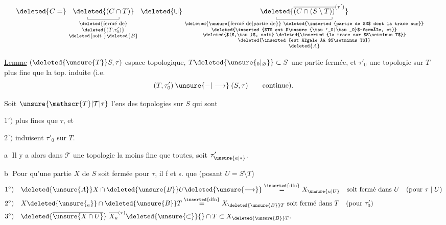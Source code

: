 \[
\begin{aligned}
 &\deleted{C=}\ \underset{\substack{\text{\deleted{fermé de}}\\\deleted{(T,\tau'_0)}\\\text{\deleted{soit }}\deleted{B}}}{\underset{\rule{.35pt}{.35em}\rule{4.4em}{.35pt}\rule{.35pt}{.35em}}{\deleted{(C\cap T)}}}
 \ \deleted{\cup}\ 
 \underset{\substack{\text{\deleted{\unsure{fermé de|partie de}} \deleted{\inserted{partie de $S$ dont la trace sur}}}\\
 \text{\deleted{\inserted{$T$ est $\unsure{\tau'_0|\tau_0}$-fermée, et}}}\\
 \text{\deleted{$(S,\tau)$, soit} \deleted{\inserted{la trace sur $S\setminus T$}}}\\
 \text{\deleted{\inserted{est égale à $S\setminus T$}}}\\\deleted{A}}}{\underset{\rule{.35pt}{.35em}\rule{7.8em}{.35pt}\rule{.35pt}{.35em}}{\deleted{\overline{(C\cap(S\setminus T))}^{(\tau')}}}}
\end{aligned}
\]

\uline{Lemme}\quad {} $(\deleted{\unsure{T}}S,\tau)$ espace topologique, $T\deleted{\unsure{_0|_{\varnothing}}}\subset S$ une partie fermée, et $\tau'_0$ une topologie  sur $T$ plus fine que la top. induite (i.e.
\[
 (T,\tau'_0)\mathbin{\unsure{-|\longrightarrow}}(S,\tau)\qquad\text{continue).}
\]


 Soit \uline{$\unsure{\mathscr{T}|\mathcal T|\tau}$} l'ens des topologies sur $S$ qui sont

$1^\circ)$ plus fines que $\tau$, et

$2^\circ)$ induisent $\tau'_0$ sur $T$.

\textcircled{a} Il y a alors dans \uline{$\mathscr T$} une topologie la moins fine que toutes, soit $\tau'_{\unsure{a|\ast}}$.

\textcircled{b} Pour qu'une partie $X$ de $S$ soit fermée pour $\tau$, il f et s. que (posant $U=S\setminus T$)
\[
\begin{aligned}
1^\circ)\quad &\deleted{\unsure{A}}X\cap \deleted{\unsure{B}}U\deleted{\unsure{\longrightarrow}}\overset{\inserted{\mathrm{dfn}}}{=}X_{\unsure{u|U}}\quad\text{soit fermé dans }U\quad(\text{pour }\tau\mid U)\\
2^\circ)\quad &X\deleted{\unsure{_a}}\cap\deleted{\unsure{B}}T\overset{\inserted{\mathrm{dfn}}}{=}X_{\deleted{\unsure{B}}T}\ \text{soit fermé dans }T\quad(\text{pour }\tau'_0)\\
3^\circ)\quad &\deleted{\overline{\unsure{X\cap U}}}\ \overline{X_u}^{(\tau)}\deleted{\unsure{\subset}}{}\cap T\subset X_{\deleted{\unsure{B}}T}.
\end{aligned}
\]
